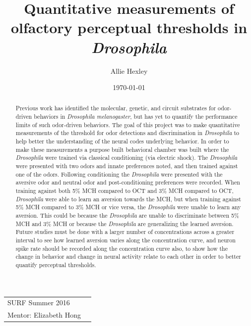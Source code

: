 \documentclass{article}
\title{Quantitative measurements of olfactory perceptual thresholds in \textit{Drosophila}} %
\author{Allie Hexley} %
\date{\today} %
\begin{document}
\maketitle %

\begin{center}
\begin{tabular}{l r}
SURF Summer 2016 \\ 
Mentor: Elizabeth Hong 
\end{tabular}
\end{center}

\begin{abstract}
Previous work has identified the molecular, genetic, and circuit substrates for odor-driven behaviors in \textit{Drosophila melanogaster}, but has yet to quantify the performance limits of such odor-driven behaviors. The goal of this project was to make quantitative measurements of the threshold for odor detections and discrimination in \textit{Drosophila} to help better the understanding of the neural codes underlying behavior. In order to make these measurements a purpose built behavioral chamber was built where the \textit{Drosophila} were trained via classical conditioning (via electric shock). The \textit{Drosophila} were presented with two odors and innate preferences noted, and then trained against one of the odors. Following conditioning the \textit{Drosophila} were presented with the aversive odor and neutral odor and post-conditioning preferences were recorded. When training against both 5\% MCH compared to OCT and 3\% MCH compared to OCT, \textit{Drosophila} were able to learn an aversion towards the MCH, but when training against 5\% MCH compared to 3\% MCH or vice versa, the \textit{Drosophila} were unable to learn any aversion. This could be because the \textit{Drosophila} are unable to discriminate between 5\% MCH and 3\% MCH or because the \textit{Drosophila} are generalizing the learned aversion. Future studies must be done with a larger number of concentrations across a greater interval to see how learned aversion varies along the concentration curve, and neuron spike rate should be recorded along the concentration curve also, to show how the change in behavior and change in neural activity relate to each other in order to better quantify perceptual thresholds.
\end{abstract}

\end{document}
